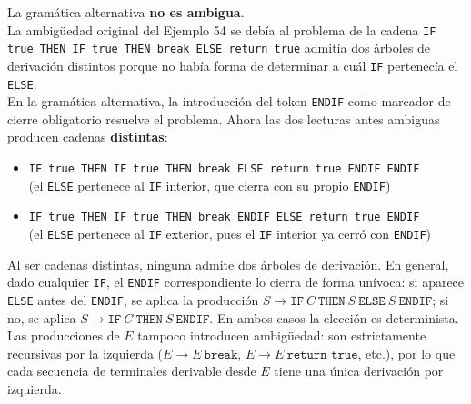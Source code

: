\documentclass[12pt]{article}
\begin{document}
    { \color{azul}
        \raggedright
        La gramática alternativa \textbf{no es ambigua}. \\[6pt]
        La ambigüedad original del Ejemplo 54 se debía al problema de la cadena
        \texttt{IF true THEN IF true THEN break ELSE return true}
        admitía dos árboles de derivación distintos porque no había forma
        de determinar a cuál \texttt{IF} pertenecía el \texttt{ELSE}. \\[6pt]
        En la gramática alternativa, la introducción del token \texttt{ENDIF}
        como marcador de cierre obligatorio resuelve el problema. Ahora las
        dos lecturas antes ambiguas producen cadenas \textbf{distintas}:
        
        \begin{itemize}
            \item \texttt{IF true THEN IF true THEN break ELSE return true
                ENDIF ENDIF} \\
                (el \texttt{ELSE} pertenece al \texttt{IF} interior,
                que cierra con su propio \texttt{ENDIF})
            \item \texttt{IF true THEN IF true THEN break ENDIF ELSE
                return true ENDIF} \\
                (el \texttt{ELSE} pertenece al \texttt{IF} exterior,
                pues el \texttt{IF} interior ya cerró con \texttt{ENDIF})
        \end{itemize}
        Al ser cadenas distintas, ninguna admite dos árboles de derivación.
        En general, dado cualquier \texttt{IF}, el \texttt{ENDIF}
        correspondiente lo cierra de forma unívoca: si aparece \texttt{ELSE}
        antes del \texttt{ENDIF}, se aplica la producción
        $S \rightarrow \texttt{IF}\ C\ \texttt{THEN}\ S\ \texttt{ELSE}\ S\
        \texttt{ENDIF}$; si no, se aplica
        $S \rightarrow \texttt{IF}\ C\ \texttt{THEN}\ S\ \texttt{ENDIF}$.
        En ambos casos la elección es determinista. \\[6pt]
        Las producciones de $E$ tampoco introducen ambigüedad: son
        estrictamente recursivas por la izquierda
        ($E \rightarrow E\ \texttt{break}$, $E \rightarrow E\ \texttt{return true}$,
        etc.), por lo que cada secuencia de terminales derivable desde $E$
        tiene una única derivación por izquierda. \\[6pt]
    }
\end{document}
